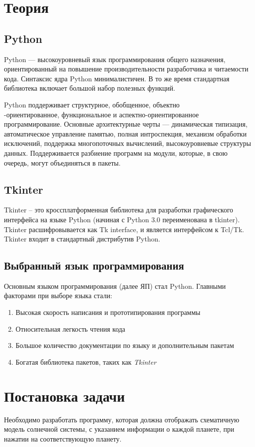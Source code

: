 \documentclass[11pt,a4paper]{report}
\begin{document}
\tableofcontents
\newpage
\section{Теория}
\subsection{Python}
Python — высокоуровневый язык программирования общего назначения, ориентированный на повышение производительности разработчика и читаемости кода. Синтаксис ядра Python минималистичен. В то же время стандартная библиотека включает большой набор полезных функций.

Python поддерживает структурное, обобщенное, объектно\\-ориентированное, функциональное и аспектно-ориентированное программирование. Основные архитектурные черты — динамическая типизация, автоматическое управление памятью, полная интроспекция, механизм обработки исключений, поддержка многопоточных вычислений, высокоуровневые структуры данных. Поддерживается разбиение программ на модули, которые, в свою очередь, могут объединяться в пакеты. 
\subsection{Tkinter}
Tkinter – это кроссплатформенная библиотека для разработки графического интерфейса на языке Python (начиная с Python 3.0 переименована в tkinter). Tkinter расшифровывается как Tk interface, и является интерфейсом к Tcl/Tk.
Tkinter входит в стандартный дистрибутив Python.

\subsection{Выбранный язык программирования}
Основным языком программирования (далее ЯП) стал Python. Главными факторами при выборе языка стали:
\begin{enumerate}
    \item Высокая скорость написания и прототипирования программы
    \item Относительная легкость чтения кода 
    \item Большое количество документации по языку и дополнительным пакетам
    \item Богатая библиотека пакетов, таких как \textit{Tkinter} 
\end{enumerate} 
\section{Постановка задачи}
Необходимо разработать программу, которая  должна отображать схематичную модель солнечной системы, с указанием информации о каждой  планете, при нажатии на соответствующую планету. 
\end{document}
